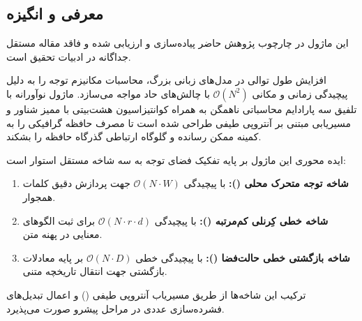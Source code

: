 \subsection{معرفی و انگیزه}
این ماژول در چارچوب پژوهش حاضر پیاده‌سازی و ارزیابی شده و فاقد مقاله مستقل جداگانه در ادبیات تحقیق است.

افزایش طول توالی در مدل‌های زبانی بزرگ، محاسبات مکانیزم توجه را به دلیل پیچیدگی زمانی و مکانی $\mathcal{O}(N^2)$ با چالش‌های حاد مواجه می‌سازد. ماژول نوآورانه  با تلفیق سه پارادایم محاسباتی ناهمگن به همراه کوانتیزاسیون هشت‌بیتی با ممیز شناور  و مسیریابی مبتنی بر آنتروپی طیفی طراحی شده است تا مصرف حافظه گرافیکی را به کمینه ممکن رسانده و گلوگاه ارتباطی گذرگاه حافظه را بشکند.

ایده محوری این ماژول بر پایه تفکیک فضای توجه به سه شاخه مستقل استوار است:
\begin{enumerate}
    \item \textbf{شاخه توجه متحرک محلی ():} با پیچیدگی $\mathcal{O}(N \cdot W)$ جهت پردازش دقیق کلمات همجوار.
    \item \textbf{شاخه خطی کِرنلی کم‌مرتبه ():} با پیچیدگی $\mathcal{O}(N \cdot r \cdot d)$ برای ثبت الگوهای معنایی در پهنه متن.
    \item \textbf{شاخه بازگشتی خطی حالت‌فضا ():} با پیچیدگی خطی $\mathcal{O}(N \cdot D)$ بر پایه معادلات بازگشتی جهت انتقال تاریخچه متنی.
\end{enumerate}
ترکیب این شاخه‌ها از طریق مسیریاب آنتروپی طیفی () و اعمال تبدیل‌های فشرده‌سازی عددی  در مراحل پیشرو صورت می‌پذیرد.
